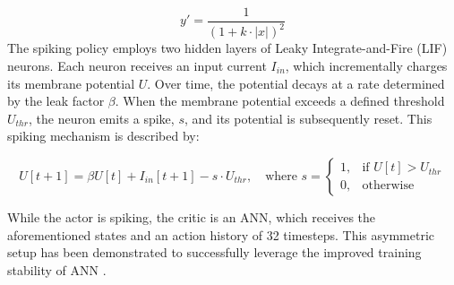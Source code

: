 \begin{equation}\label{eq:fast_sigmoid}
y' = \frac{1}{(1+k\cdot |x|)^2}
\end{equation}
The spiking policy employs two hidden layers of Leaky Integrate-and-Fire (LIF) neurons. Each neuron receives an input current \( I_{in} \), which incrementally charges its membrane potential \( U \). Over time, the potential decays at a rate determined by the leak factor \( \beta \). When the membrane potential exceeds a defined threshold \( U_{thr} \), the neuron emits a spike, \( s\), and its potential is subsequently reset. This spiking mechanism is described by:

\begin{equation}
U[t+1] = \beta U[t] + I_{in}[t+1] - s \cdot U_{thr}, \quad \text{where } s = \begin{cases}
1, & \text{if } U[t] > U_{thr} \\
0, & \text{otherwise}
\end{cases}
\end{equation}



While the actor is spiking,  the critic is an ANN, which receives the aforementioned states and an action history of 32 timesteps. This asymmetric setup has been demonstrated to successfully leverage the improved training stability of ANN \cite{Tang2020, Tang2020_Hardware}.

